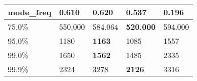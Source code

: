 \begin{table}[H]
\begin{tabular}{|l|m{10em}|m{10em}|m{10em}|m{10em}|}
\hline mode\_freq & 0.610 & \bfseries 0.620 & 0.537 & \cellcolor[rgb]{0.9, 0.54, 0.52} 0.196 \\
\hline 75.0\% & 550.000 & 584.064 & \bfseries 520.000 & \cellcolor[rgb]{0.9, 0.54, 0.52} 594.000 \\
\hline 95.0\% & 1180 & \bfseries 1163 & 1085 & \cellcolor[rgb]{0.9, 0.54, 0.52} 1557 \\
\hline 99.0\% & 1650 & \bfseries 1562 & 1485 & \cellcolor[rgb]{0.9, 0.54, 0.52} 2335 \\
\hline 99.9\% & 2324 & 3278 & \bfseries 2126 & \cellcolor[rgb]{0.9, 0.54, 0.52} 3316 \\
\hline
\end{tabular}
\end{table}
